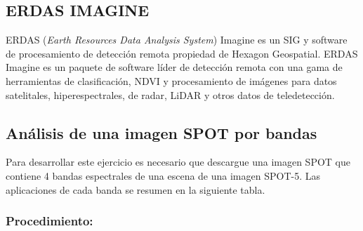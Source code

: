 \documentclass[a4paper,oneside,11pt,]{article}
\begin{document}
\subsection{ERDAS IMAGINE}

ERDAS (\emph{Earth Resources Data Analysis System}) Imagine es un SIG y software de procesamiento de detección remota propiedad de Hexagon Geospatial. ERDAS Imagine es un paquete de software líder de detección remota con una gama de herramientas de clasificación, NDVI y procesamiento de imágenes para datos satelitales, hiperespectrales, de radar, LiDAR y otros datos de teledetección.

\subsection{Análisis de una imagen SPOT por bandas}

Para desarrollar este ejercicio es necesario que descargue una imagen SPOT que contiene 4 bandas espectrales de  una escena de una imagen SPOT-5. Las aplicaciones de cada banda se resumen en la siguiente tabla.

\subsubsection{Procedimiento:}
\end{document}

